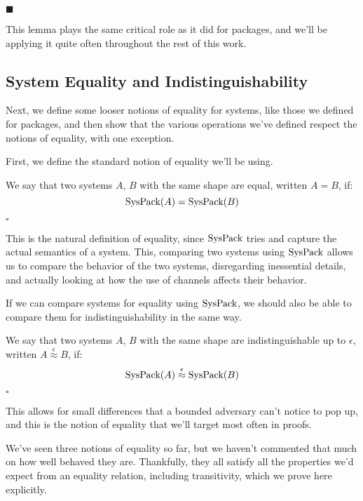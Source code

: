 \begin{lemma}
$\blacksquare$
\end{lemma}

This lemma plays the same critical role as it did for packages,
and we'll be applying it quite often throughout the rest
of this work.

\subsection{System Equality and Indistinguishability}

Next, we define some looser notions of equality for systems,
like those we defined for packages,
and then show that the various operations we've defined
respect the notions of equality, with one exception.

First, we define the standard notion of equality we'll be using.

\begin{definition}
  We say that two systems $A$, $B$ with the same shape are equal, written $A = B$,
  if:
  $$
  \text{SysPack}(A) = \text{SysPack}(B)
  $$

  $\square$
\end{definition}

This is the natural definition of equality, since $\text{SysPack}$
tries and capture the actual semantics of a system.
This, comparing two systems using $\text{SysPack}$ allows
us to compare the behavior of the two systems,
disregarding inessential details, and actually
looking at how the use of channels affects their behavior.

If we can compare systems for equality using $\text{SysPack}$,
we should also be able to compare them for indistinguishability
in the same way.

\begin{definition}
  We say that two systems $A$, $B$ with the same shape are indistinguishable up to $\epsilon$,
  written $A \overset{\epsilon}{\approx} B$,
  if:
  $$
  \text{SysPack}(A) \overset{\epsilon}{\approx} \text{SysPack}(B)
  $$

  $\square$
\end{definition}

This allows for small differences that a bounded adversary can't notice
to pop up, and this is the notion of equality that we'll
target most often in proofs.

We've seen three notions of equality so far, but we haven't commented
that much on how well behaved they are.
Thankfully, they all satisfy all the properties we'd
expect from an equality relation, including transitivity,
which we prove here explicitly.

